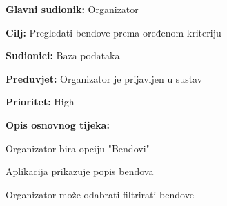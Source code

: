 \noindent {}
	\begin{packed_item}
		
		\item \textbf{Glavni sudionik:} Organizator
		\item \textbf{Cilj:} Pregledati bendove prema oređenom kriteriju
		\item \textbf{Sudionici:} Baza podataka
		\item \textbf{Preduvjet:} Organizator je prijavljen u sustav
		\item \textbf{Prioritet:} High
		\item \textbf{Opis osnovnog tijeka:} 
		
		\item[] \begin{packed_enum}
			
			\item Organizator bira opciju "Bendovi"
			\item Aplikacija prikazuje popis bendova
			\item Organizator može odabrati filtrirati bendove
		\end{packed_enum}  
	
	\end{packed_item}


